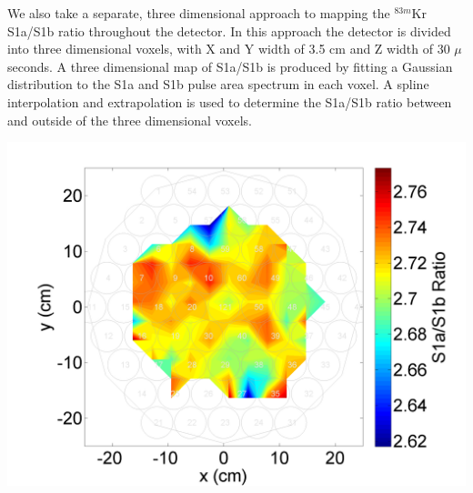 \documentclass[a4paper,12pt]{article}
\begin{document}
{We also take a separate, three dimensional approach to mapping the $^{83m}$Kr S1a/S1b ratio throughout the detector. In this approach the detector is divided into three dimensional voxels, with X and Y width of 3.5 cm and Z width of 30 $\mu$seconds.  A three dimensional map of S1a/S1b is produced by fitting a Gaussian distribution to the S1a and S1b pulse area spectrum in each voxel.  A spline interpolation and extrapolation is used to determine the S1a/S1b ratio between and outside of the three dimensional voxels.

\begin{center}
\includegraphics[scale=0.6]{Run04Corrections/S1aS1bvXY.png}
 \label{fig:S1aS1bXYDep}
\end{center}

}
\end{document}
